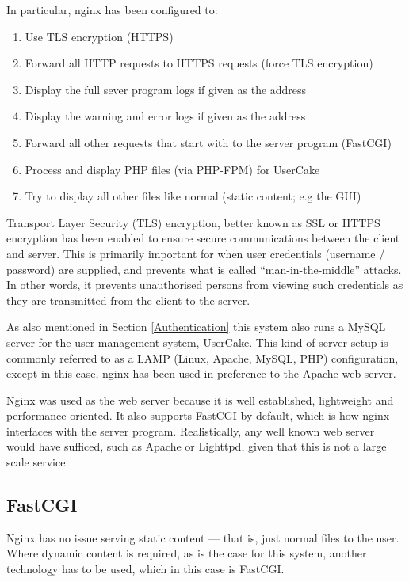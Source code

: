 In particular, nginx has been configured to:
\begin{enumerate}
	\item Use TLS encryption (HTTPS)
	\item Forward all HTTP requests to HTTPS requests (force TLS encryption)
	\item Display the full sever program logs if given  as the address
	\item Display the warning and error logs if given  as the address
	\item Forward all other requests that start with \api{} to the server program (FastCGI)
	\item Process and display PHP files (via PHP-FPM) for UserCake
	\item Try to display all other files like normal (static content; e.g the GUI)
\end{enumerate}

Transport Layer Security (TLS) encryption, better known as SSL or HTTPS encryption has been enabled to ensure secure communications between the client and server. This is primarily important for when user credentials (username / password) are supplied, and prevents what is called ``man-in-the-middle'' attacks. In other words, it prevents unauthorised persons from viewing such credentials as they are transmitted from the client to the server. 

As also mentioned in Section \ref{Authentication} this system also runs a MySQL server for the user management system, UserCake. This kind of server setup is commonly referred to as a LAMP (Linux, Apache, MySQL, PHP) configuration\cite{}, except in this case, nginx has been used in preference to the Apache web server. 

Nginx was used as the web server because it is well established, lightweight and performance oriented. It also supports FastCGI by default, which is how nginx interfaces with the server program. Realistically, any well known web server would have sufficed, such as Apache or Lighttpd, given that this is not a large scale service.

\subsection{FastCGI}

Nginx has no issue serving static content --- that is, just normal files to the user. Where dynamic content is required, as is the case for this system, another technology has to be used, which in this case is FastCGI.

